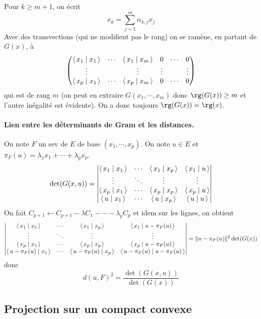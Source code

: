 Pour $k\geq m+1$, on écrit \[
    x_k=\sum_{j=1}^m \alpha_{k,j}x_j
\] 
Avec des transvections (qui ne modifient pas le rang) on se ramène, en partant de $G(x)$, à  \[
\begin{pmatrix}
    \scalar{x_1}{x_1} & \cdots  & \scalar{x_1}{x_m} & 0 & \cdots  & 0 \\
    \vdots &  & \vdots & \vdots & & \vdots\\
    \scalar{x_p}{x_1} &\cdots & \scalar{x_p}{x_m} &0 & \cdots & 0
\end{pmatrix}
\] 
qui est de rang $m$ (on peut en extraire $G(x_1, \cdots , x_m)$ donc $\rg(G(x))\geq m$ et l'autre inégalité est évidente). On a donc toujours $\rg (G(x))=\rg(x)$.


\paragraph*{Lien entre les déterminants de Gram et les distances.}
On note $F$ un sev de  $E$ de base  $(x_1, \cdots , x_p)$. On note $u \in  E$ et $\pi_F(u)=\lambda_1 x_1+\cdots +\lambda_px_p$.
\[
    \det(G(x, u)) = \begin{vmatrix}
        \scalar{x_1}{x_1} & \cdots  & \scalar{x_1}{x_p} & \scalar{x_1}{u} \\
        \vdots & \ddots & \vdots & \vdots \\
        \scalar{x_p}{x_1} & \cdots  & \scalar{x_p}{x_p} & \scalar{x_p}{u} \\
        \scalar{u}{x_1} & \cdots  & \scalar{u}{x_p}  &\scalar{u}{u} 
    \end{vmatrix}
\] 
On fait $C_{p+1}\leftarrow C_{p+1}-\lambda C_1-\cdots -\lambda_p C_p$ et idem sur les lignes, on obtient  \[
\begin{vmatrix}
    \scalar{x_1}{x_1} & \cdots  & \scalar{x_1}{x_p} & \scalar{x_1}{u-\pi_F(u)} \\
        \vdots & \ddots & \vdots & \vdots \\
        \scalar{x_p}{x_1} & \cdots  & \scalar{x_p}{x_p} & \scalar{x_p}{u-\pi_F(u)} \\
        \scalar{u-\pi_F(u)}{x_1} & \cdots  & \scalar{u-\pi_F(u)}{x_p}  &\scalar{u-\pi_F(u)}{u-\pi_F(u)} 
    \end{vmatrix}=\|u-\pi_F(u)\|^2 \det(G(x))
\] 
donc \[
    d(u, F)^2 = \frac{\det(G(x, u))}{\det(G(x))}
\] 

\subsection{Projection sur un compact convexe}

